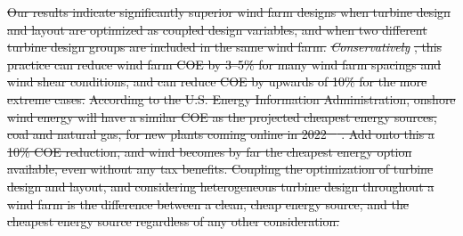 \documentclass[wes, manuscript]{copernicus}
\providecommand{\DIFdel}[1]{{\protect\color{red}\sout{#1}}}                      %
\providecommand{\DIFdelbegin}{} %
\providecommand{\DIFdelend}{} %
\begin{document}
\DIFdelbegin \DIFdel{Our results indicate significantly superior wind farm designs when turbine design and layout are optimized as coupled design variables, and when two different turbine design groups are included in the same wind farm. }\textit{\DIFdel{Conservatively}}%
\DIFdel{, this practice can reduce wind farm COE by 3--5\% for many wind farm spacings and wind shear conditions, and can reduce COE by upwards of 10\% for the more extreme cases.
}\DIFdelend %
\DIFdelbegin \DIFdel{According to the U.S. Energy Information Administration, onshore wind energy will have a similar COE as the projected cheapest energy sources, coal and natural gas, for new plants coming online in 2022 \mbox{%
\citep{levelized}}\hspace{0pt}%
. Add onto this a 10\% COE reduction, and wind becomes by far the cheapest energy option available, even without any tax benefits. Coupling the optimization of turbine design and layout, and considering heterogeneous turbine design throughout a wind farm is the difference between a clean, cheap energy source, and the cheapest energy source regardless of any other consideration. 
}\DIFdelend %
\end{document}
